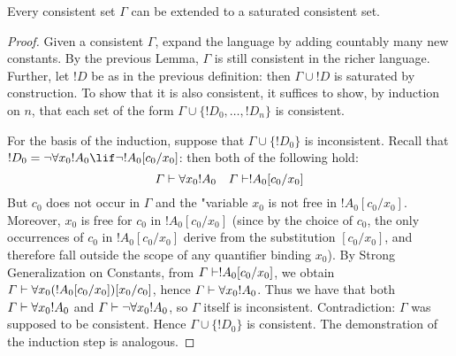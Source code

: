 \documentclass[../../include/open-logic-section]{subfiles}
\begin{document}
\begin{thm}
  Every consistent set $\Gamma$ can be extended to a saturated
  consistent set.
\end{thm}

\begin{proof}
Given a consistent $\Gamma$, expand the language by adding countably
many new constants. By the previous Lemma, $\Gamma$ is still
consistent in the richer language. Further, let $!D$ be as in the
previous definition: then $\Gamma \cup !D$ is saturated by
construction. To show that it is also consistent, it suffices to show,
by induction on $n$, that each set of the form $\Gamma \cup \{
!D_0, \dots, !D_n \}$ is consistent.

For the basis of the induction, suppose that $\Gamma \cup \{ !D_0
\}$ is inconsistent. Recall that $!D_0 = \lnot \lforall[x_0] !A_0
\lif \lnot !A_0 [c_0/x_0]$: then both of the following hold:
\[
\Gamma \Proves \lforall[x_0] !A_0
\quad
\Gamma \Proves !A_0[c_0/x_0]
\]
But $c_0$ does not occur in $\Gamma$ and the "{variable} $x_0$ is not
free in $!A_0 [ c_0/x_0]$. Moreover, $x_0$ is free for $c_0$ in $!A_0
[c_0/x_0]$ (since by the choice of $c_0$, the only occurrences of
$c_0$ in $!A_0 [c_0/x_0]$ derive from the substitution $[c_0/x_0]$,
and therefore fall outside the scope of any quantifier binding
$x_0$). By Strong Generalization on Constants, from $\Gamma \Proves
!A_0 [c_0/x_0]$, we obtain $\Gamma \Proves \lforall[x_0] ( !A_0
[c_0/x_0] ) [x_0/c_0]$, hence $\Gamma \Proves \lforall[x_0]
!A_0$. Thus we have that both $\Gamma \Proves \lforall[x_0] !A_0$ and
$\Gamma \Proves \lnot \lforall[x_0] !A_0$, so $\Gamma$ itself is
inconsistent. Contradiction: $\Gamma$ was supposed to be
consistent. Hence $\Gamma \cup \{ !D_0\}$ is consistent. The
demonstration of the induction step is analogous.
\end{proof}
\end{document}
